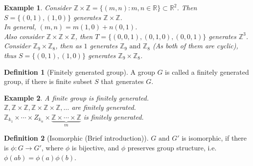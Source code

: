\documentclass{article}
\theoremstyle{MyNonumberplain}
\theoremstyle{break}
\newcommand{\infixand}{\text{ and }}
\theoremstyle{break}
\newtheorem{example}{Example}[section]
\theoremstyle{break}
\theoremstyle{definition}
\theoremstyle{break}
\newtheorem{definition}{Definition}[section]
\begin{document}
\begin{expbox}
    \begin{example}
        Consider $\mathbb{Z} \times \mathbb{Z}= \{ (m, n) : m, n \in \mathbb{R} \}
        \subset \mathbb{R}^2$. Then $S = \{ (0, 1), (1, 0) \}$ generates $\mathbb{Z}
        \times \mathbb{Z}$.\\

        In general, $(m, n) = m (1, 0) + n (0, 1)$.\\

        Also consider $\mathbb{Z} \times \mathbb{Z} \times \mathbb{Z}$, then $T = \{
        (0, 0, 1), (0, 1, 0), (0, 0, 1) \}$ generates $\mathbb{Z}^3$.\\

        Consider $\mathbb{Z}_9 \times \mathbb{Z}_8$, then as $1$ generates
        $\mathbb{Z}_9 \infixand \mathbb{Z}_8$ (As both of them are cyclic), thus $S =
        \{ (0, 1), (1, 0) \}$ generates $\mathbb{Z}_9 \times \mathbb{Z}_8$.
    \end{example}
\end{expbox}

\begin{defbox}
    \begin{definition}[Finitely generated group]
        A group $G$ is called a finitely generated group, if there is finite subset $S$ that generates $G$.
    \end{definition}
\end{defbox}

\begin{expbox}
    \begin{example}
        A finite group is finitely generated.\\

        $\mathbb{Z}, \mathbb{Z} \times \mathbb{Z}, \mathbb{Z} \times \mathbb{Z} \times
        \mathbb{Z}, \ldots$ are finitely generated.\\

        $\mathbb{Z}_{k_1} \times \cdots \times Z_{k_n} \times
        \underset{m}{\underbrace{\mathbb{Z} \times \cdots \times \mathbb{Z}}}$ is
        finitely generated. 
    \end{example}
\end{expbox}

\begin{defbox}
    \begin{definition}[Isomorphic (Brief introduction)]
        $G \infixand G'$ is isomorphic, if there is $\phi : G \rightarrow G'$, where
        $\phi$ is bijective, and $\phi$ preserves group structure, i.e. $\phi (a b) =
        \phi (a) \phi (b)$.
    \end{definition}
\end{defbox}
\end{document}
